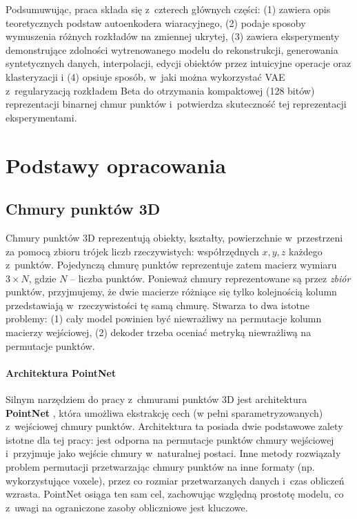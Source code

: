 \documentclass{iithesis}
\begin{document}
Podsumuwując, praca składa się z~czterech głównych części: (1) zawiera opis teoretycznych podstaw
autoenkodera wiaracyjnego, (2) podaje sposoby wymuszenia różnych rozkładów na zmiennej ukrytej,
(3) zawiera eksperymenty demonstrujące zdolności wytrenowanego modelu do rekonstrukcji,
generowania syntetycznych danych, interpolacji, edycji obiektów przez intuicyjne operacje oraz klasteryzacji
i (4) opsiuje sposób, w~jaki można wykorzystać VAE z~regularyzacją rozkładem Beta do otrzymania
kompaktowej (128 bitów) reprezentacji binarnej chmur punktów i~potwierdza skuteczność tej
reprezentacji eksperymentami.

\chapter{Podstawy opracowania}

\section{Chmury punktów 3D} \label{sec:point_clouds}
Chmury punktów 3D reprezentują obiekty, kształty, powierzchnie w~przestrzeni za pomocą zbioru
trójek liczb rzeczywistych: współrzędnych $x,y,z$ każdego z~punktów.
Pojedynczą chmurę punktów reprezentuje zatem macierz wymiaru $3 \times N$,
gdzie $N$ -- liczba punktów. Ponieważ chmury reprezentowane są przez \textit{zbiór} punktów,
przyjmujemy, że dwie macierze różniące się tylko kolejnością kolumn
przedstawiają w~rzeczywistości tę samą chmurę. Stwarza to dwa istotne problemy: (1) cały model powinien
być niewrażliwy na permutacje kolumn macierzy wejściowej, (2) dekoder trzeba oceniać metryką niewrażliwą
na permutacje punktów.

\subsubsection{Architektura PointNet}
Silnym narzędziem do pracy z~chmurami punktów 3D jest architektura \textbf{PointNet} \cite{pointnet},
która umożliwa ekstrakcję cech (w pełni sparametryzowanych) z~wejściowej chmury punktów.
Architektura ta posiada dwie podstawowe zalety istotne dla tej pracy: jest odporna na permutacje
punktów chmury wejściowej i~przyjmuje jako wejście chmury w~naturalnej postaci.
Inne metody \cite{voxnet,modelnet} rozwiązały problem permutacji przetwarzając
chmury punktów na inne formaty (np. wykorzystujące voxele), przez co rozmiar przetwarzanych
danych i~czas obliczeń wzrasta. PointNet osiąga ten sam cel, zachowując
względną prostotę modelu, co z~uwagi na ograniczone zasoby obliczniowe jest kluczowe.
\end{document}
